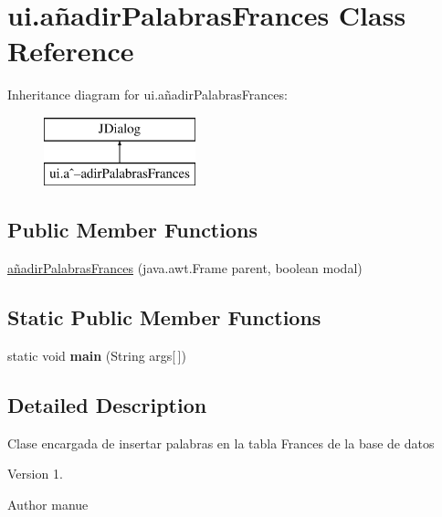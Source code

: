 \hypertarget{classui_1_1a_xC3_xB1adir_palabras_frances}{}\section{ui.\+añadir\+Palabras\+Frances Class Reference}
\label{classui_1_1a_xC3_xB1adir_palabras_frances}
Inheritance diagram for ui.\+añadir\+Palabras\+Frances\+:\begin{figure}[H]
\begin{center}
\leavevmode
\includegraphics[height=2.000000cm]{classui_1_1a_xC3_xB1adir_palabras_frances}
\end{center}
\end{figure}
\subsection*{Public Member Functions}
\begin{DoxyCompactItemize}
\item 
\mbox{\hyperlink{classui_1_1a_xC3_xB1adir_palabras_frances_aea36658701adb44f6ef77de617203858}{añadir\+Palabras\+Frances}} (java.\+awt.\+Frame parent, boolean modal)
\end{DoxyCompactItemize}
\subsection*{Static Public Member Functions}
\begin{DoxyCompactItemize}
\item 
\mbox{\label{classui_1_1a_xC3_xB1adir_palabras_frances_a256312d8c98fc1f8d93e69bf1429ec87}} 
static void {\bfseries main} (String args\mbox{[}$\,$\mbox{]})
\end{DoxyCompactItemize}


\subsection{Detailed Description}
Clase encargada de insertar palabras en la tabla Frances de la base de datos \begin{DoxyVersion}{Version}
1. 
\end{DoxyVersion}
\begin{DoxyAuthor}{Author}
manue 
\end{DoxyAuthor}


